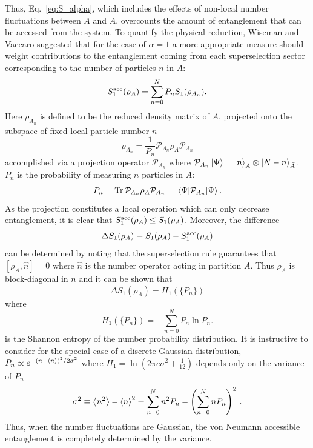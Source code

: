 Thus, Eq.~\eqref{eq:S_alpha}, which includes the effects of non-local number fluctuations between $A$ and $\bar{A}$, overcounts the amount of entanglement that can be accessed from the system.  To quantify the physical reduction, Wiseman and Vaccaro \cite{Wiseman:2003jx} suggested that for the case of $\alpha = 1$ a more appropriate measure should weight contributions to the entanglement coming from each superselection sector corresponding to the number of particles $n$ in $A$:
%
\begin{equation}
    S_1^{\rm{acc}}(\rho_A)=\sum_{n=0}^{N} P_n S_1(\rho_{A_n})
\label{eq:S1acc}.
\end{equation}
%
Here $\rho_{A_{n}}$ is defined to be the reduced density matrix of $A$, projected onto the subspace of fixed local particle number $n$ 
%
\begin{equation}
    \rho_{A_n} = \frac{1}{P_n}{\mathcal{P}}_{A_n} \rho_{A} {\mathcal{P}}_{A_n}
\label{eq:rhoAn}
\end{equation}
%
accomplished via a projection operator ${\mathcal{P}}_{A_n}$ where
${\mathcal{P}}_{A_n} \ket{\Psi} = \ket{n}_A\otimes\ket{N-n}_{\bar{A}}$.  
$P_n$ is the probability of measuring $n$ particles in $A$:
%
\begin{equation}
    P_n = \mathrm{Tr}\, {\mathcal{P}}_{A_n} \rho_A{\mathcal{P}}_{A_n}
    = \expval{{\mathcal{P}}_{A_n}}{\Psi}.
    \label{eq:Pn}
\end{equation}
%
As the projection constitutes a local operation which can only decrease
entanglement,  it is clear that $S_1^{\rm acc}(\rho_A) \le S_1(\rho_A)$. 
Moreover, the difference 
%
\begin{equation}
    \Delta S_1 (\rho_A) \equiv S_1(\rho_A) - S_1^{\rm acc}(\rho_A)
    \label{eq:DeltaS1}
\end{equation}
%
can be determined  by noting that the superselection rule guarantees that $[\rho_A,\hat{n}]=0$ where $\hat{n}$ is the number operator acting in partition $A$. Thus $\rho_A$ is block-diagonal in $n$ and it can be shown \cite{Klich:2008se} that 
%
\begin{equation}
    \Delta S_1 (\rho_A) =  H_1(\{P_n\})
\label{eq:DS1H1}
\end{equation}
%
where
%
\begin{equation}
    H_1(\{P_n\}) = -\sum_{n=0}^N P_n \ln P_n.
\label{eq:H1}
\end{equation}
%
is the Shannon entropy of the number probability distribution.  It is instructive to consider  for the special case of a discrete Gaussian distribution, $P_n \propto e^{-(n-\expval{n})^2/2\sigma^2}$ where $H_1 = \ln\left(2\pi e \sigma^2 + \tfrac{1}{12}\right)$ depends only on the variance of $P_n$
%
\begin{equation}
    \sigma^2 \equiv \expval{n^2}-\expval{n}^2 = \sum_{n=0}^N n^2 P_n  - \left(\sum_{n=0}^N n P_n\right)^2\,.
\label{eq:sigma2}
\end{equation}
%
Thus, when the number fluctuations are Gaussian, the von Neumann accessible entanglement is completely determined by the variance.

